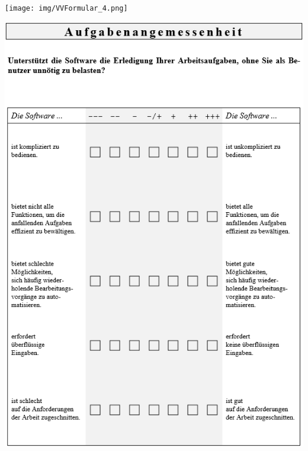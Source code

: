 \bigskip\noindent
\begin{minipage}{\textwidth}
  \centering
  \texttt{[image: img/VVFormular\_4.png]}
\end{minipage}

\let\cleardoublepage\clearpage
{}
\label{sec:ISOFragebogen}
\bigskip\noindent
\begin{minipage}{\textwidth}
  \centering
  \includegraphics[scale=0.97]{img/ISO9241-10Fragebogen_S1.PNG}
\end{minipage}

